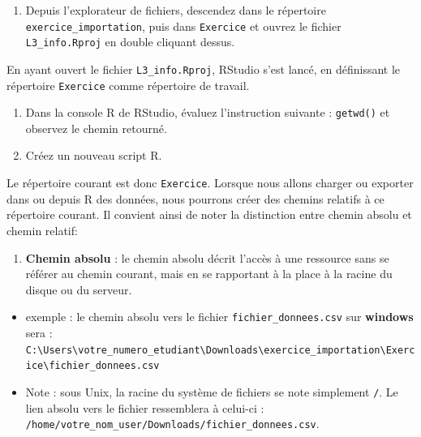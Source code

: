 \documentclass[
  11pt,
]{book}
\providecommand{\tightlist}{%
  \setlength{\itemsep}{0pt}\setlength{\parskip}{0pt}}
\numberwithin{equation}{section}
\numberwithin{countremarque}{section}
\newenvironment{greenbox}{
  \begin{tcolorbox}[breakable, colback=vert,coltext=black,
                  colframe=grisfonce]}
 {\end{tcolorbox}}
\begin{document}
\begin{greenbox}

\begin{enumerate}
\def\labelenumi{\arabic{enumi}.}
\setcounter{enumi}{3}
\tightlist
\item
  Depuis l'explorateur de fichiers, descendez dans le répertoire \texttt{exercice\_importation}, puis dans \texttt{Exercice} et ouvrez le fichier \texttt{L3\_info.Rproj} en double cliquant dessus.
\end{enumerate}

En ayant ouvert le fichier \texttt{L3\_info.Rproj}, RStudio s'est lancé, en définissant le répertoire \texttt{Exercice} comme répertoire de travail.

\begin{enumerate}
\def\labelenumi{\arabic{enumi}.}
\setcounter{enumi}{4}
\tightlist
\item
  Dans la console R de RStudio, évaluez l'instruction suivante : \texttt{getwd()} et observez le chemin retourné.
\item
  Créez un nouveau script R.
\end{enumerate}

\end{greenbox}

Le répertoire courant est donc \texttt{Exercice}. Lorsque nous allons charger ou exporter dans ou depuis R des données, nous pourrons créer des chemins relatifs à ce répertoire courant. Il convient ainsi de noter la distinction entre chemin absolu et chemin relatif:

\begin{enumerate}
\def\labelenumi{\arabic{enumi}.}
\tightlist
\item
  \textbf{Chemin absolu} : le chemin absolu décrit l'accès à une ressource sans se référer au chemin courant, mais en se rapportant à la place à la racine du disque ou du serveur.
\end{enumerate}

\begin{itemize}
\tightlist
\item
  exemple : le chemin absolu vers le fichier \texttt{fichier\_donnees.csv} sur \textbf{windows} sera : \texttt{C:\textbackslash{}Users\textbackslash{}votre\_numero\_etudiant\textbackslash{}Downloads\textbackslash{}exercice\_importation\textbackslash{}Exercice\textbackslash{}fichier\_donnees.csv}
\item
  Note : sous Unix, la racine du système de fichiers se note simplement \texttt{/}. Le lien absolu vers le fichier ressemblera à celui-ci : \texttt{/home/votre\_nom\_user/Downloads/fichier\_donnees.csv}.
\end{itemize}
\end{document}
